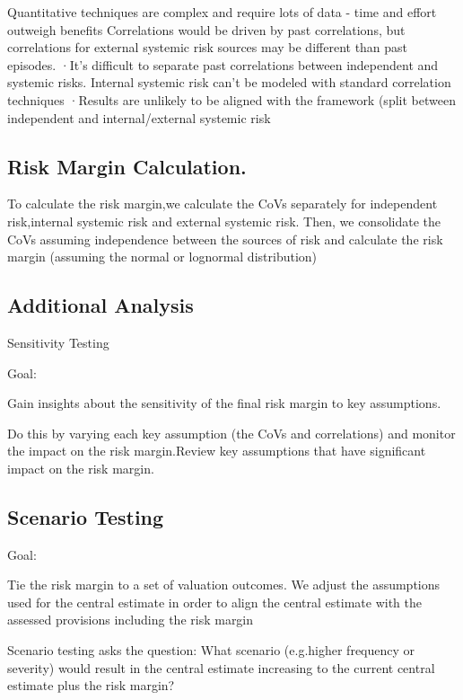 \documentclass[
]{article}
\begin{document}
Quantitative techniques are complex and require lots of data - time and
effort outweigh benefits Correlations would be driven by past
correlations, but correlations for external systemic risk sources may be
different than past episodes. ·It's difficult to separate past
correlations between independent and systemic risks. Internal systemic
risk can't be modeled with standard correlation techniques ·Results are
unlikely to be aligned with the framework (split between independent and
internal/external systemic risk

\subsection{Risk Margin Calculation.}\label{risk-margin-calculation.}

To calculate the risk margin,we calculate the CoVs separately for
independent risk,internal systemic risk and external systemic risk.
Then, we consolidate the CoVs assuming independence between the sources
of risk and calculate the risk margin (assuming the normal or lognormal
distribution)

\subsection{Additional Analysis}\label{additional-analysis}

Sensitivity Testing

Goal:

Gain insights about the sensitivity of the final risk margin to key
assumptions.

Do this by varying each key assumption (the CoVs and correlations) and
monitor the impact on the risk margin.Review key assumptions that have
significant impact on the risk margin.

\subsection{Scenario Testing}\label{scenario-testing}

Goal:

Tie the risk margin to a set of valuation outcomes. We adjust the
assumptions used for the central estimate in order to align the central
estimate with the assessed provisions including the risk margin

Scenario testing asks the question: What scenario (e.g.higher frequency
or severity) would result in the central estimate increasing to the
current central estimate plus the risk margin?
\end{document}
